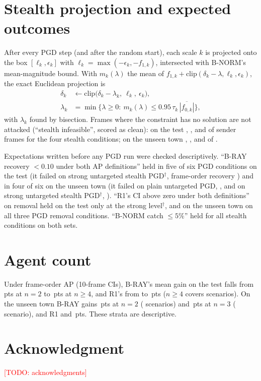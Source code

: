 \documentclass[conference]{IEEEtran}
\newcommand{\TODO}[1]{\textcolor{red}{[TODO: #1]}}
\newcommand{\pts}{\,pts}
\begin{document}
\section{Stealth projection and expected outcomes}
\label{app:stealth}
After every PGD step (and after the random start), each scale $k$ is projected onto the box
$[\ell_k,\epsilon_k]$ with $\ell_k=\max(-\epsilon_k,-f_{1,k})$, intersected with B-NORM's mean-magnitude bound.
With $m_k(\lambda)$ the mean of $f_{1,k}+\mathrm{clip}(\delta_k-\lambda,\ell_k,\epsilon_k)$, the exact Euclidean
projection is
\begin{equation}
\begin{split}
\delta_k&\leftarrow \mathrm{clip}\big(\delta_k-\lambda_k,\ \ell_k,\ \epsilon_k\big),\\
\lambda_k&=\min\big\{\lambda\ge 0:\ m_k(\lambda)\le 0.95\,\tau_k\,\overline{|f_{0,k}|}\big\},
\end{split}
\label{eq:stealth}
\end{equation}
with $\lambda_k$ found by bisection. Frames where the constraint has no solution are not attacked (``stealth
infeasible'', scored as clean): on the test \InfeasiblePgdUntSt, \InfeasiblePgdRemSt, \InfeasiblePgdUntStStrong{}
and \InfeasiblePgdRemStStrong{} of \WithSenderPgdRemSt{} sender frames for the four stealth conditions; on the
unseen town \CulInfeasiblePgdUntSt, \CulInfeasiblePgdRemSt, \CulInfeasiblePgdUntStStrong{} and
\CulInfeasiblePgdRemStStrong{} of \CulWithSender.

Expectations written before any PGD run were checked descriptively. ``B-RAY recovery $<0.10$ under both AP
definitions'' held in five of six PGD conditions on the test (it failed on strong untargeted stealth
PGD$^\dagger$, frame-order recovery \RecFramePgdUntStStrongBRAY) and in four of six on the unseen town (it failed
on plain untargeted PGD, \CulRecFramePgdUntBRAY, and on strong untargeted stealth PGD$^\dagger$,
\CulRecFramePgdUntStStrongBRAY). ``R1's CI above zero under both definitions'' on removal held on the test only at
the strong level$^\dagger$, and on the unseen town on all three PGD removal conditions. ``B-NORM catch
${\le}5\%$'' held for all stealth conditions on both sets.

\section{Agent count}
\label{app:agents}
Under frame-order AP (10-frame CIs), B-RAY's mean gain on the test falls from \ByNTwoBRAY\pts{} \ByNTwoBRAYCI{}
at $n=2$ to \ByNFourPlusBRAY\pts{} \ByNFourPlusBRAYCI{} at $n\ge 4$, and R1's from \ByNTwoRONE{} to
\ByNFourPlusRONE\pts{} ($n\ge 4$ covers \ByNFourPlusScen{} scenarios). On the unseen town B-RAY gains
\CulByNTwoBRAY\pts{} \CulByNTwoBRAYCI{} at $n=2$ (\CulByNTwoScen{} scenarios) and \CulByNThreeBRAY\pts{}
\CulByNThreeBRAYCI{} at $n=3$ (\CulByNThreeScen{} scenario), and R1 \CulByNTwoRONE{} and \CulByNThreeRONE\pts.
These strata are descriptive.

\section*{Acknowledgment}
\TODO{acknowledgments}



\end{document}
